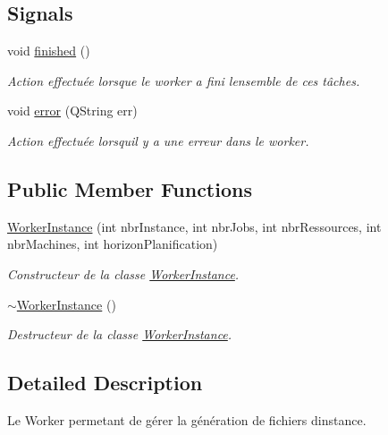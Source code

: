 \subsection*{Signals}
\begin{DoxyCompactItemize}
\item 
void \hyperlink{classWorkerInstance_ac9e45034de2450472fcc07ba0b960000}{finished} ()
\begin{DoxyCompactList}\small\item\em Action effectuée lorsque le worker a fini l\textquotesingle{}ensemble de ces tâches. \end{DoxyCompactList}\item 
void \hyperlink{classWorkerInstance_a7327b868e3d96daa63e71c47076e598e}{error} (Q\+String err)
\begin{DoxyCompactList}\small\item\em Action effectuée lorsqu\textquotesingle{}il y a une erreur dans le worker. \end{DoxyCompactList}\end{DoxyCompactItemize}
\subsection*{Public Member Functions}
\begin{DoxyCompactItemize}
\item 
\hyperlink{classWorkerInstance_a671ad15f8e70f05028c3fb1efe9bfe8d}{Worker\+Instance} (int nbr\+Instance, int nbr\+Jobs, int nbr\+Ressources, int nbr\+Machines, int horizon\+Planification)
\begin{DoxyCompactList}\small\item\em Constructeur de la classe \hyperlink{classWorkerInstance}{Worker\+Instance}. \end{DoxyCompactList}\item 
\hyperlink{classWorkerInstance_a0072f72256aacba8cb97ab4f50bcb939}{$\sim$\+Worker\+Instance} ()
\begin{DoxyCompactList}\small\item\em Destructeur de la classe \hyperlink{classWorkerInstance}{Worker\+Instance}. \end{DoxyCompactList}\end{DoxyCompactItemize}


\subsection{Detailed Description}
Le Worker permetant de gérer la génération de fichiers d\textquotesingle{}instance. 

